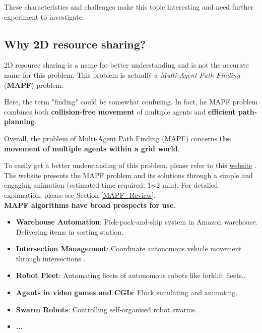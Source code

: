 \documentclass[12pt, oneside]{article}
\begin{document}
These characteristics and challenges make this topic interesting and need further experiment to investigate.

\subsection{Why 2D resource sharing?}

    2D resource sharing is a name for better understanding and is not the accurate name for this problem. This problem is actually a \textit{Multi-Agent Path Finding} (\textbf{MAPF})\cite{MAPF_Deadlock_Explain2} problem. 
    
    Here, the term "finding" could be somewhat confusing. In fact, he MAPF problem combines both \textbf{collision-free movement} of multiple agents and \textbf{efficient path-planning}.

    Overall, the problem of Multi-Agent Path Finding (MAPF) concerns \textbf{the movement of multiple agents within a grid world}.
    
    To easily get a better understanding of this problem, please refer to this \href{https://primalgrid.netlify.app/primal}{website} \footnotemark. The website presents the MAPF problem and its solutions through a simple and engaging animation (estimated time required: 1$\sim$2 min). For detailed explanation, please see Section \ref{MAPF_Review}.
    \\[8pt]
    \textbf{MAPF algorithms have broad prospects for use}.
    \begin{itemize}
        \item \textbf{Warehouse Automation}: Pick-pack-and-ship system in Amazon warehouse\cite{Amazon_Kiva}. Delivering items in sorting station\cite{Warehouse_Automation1,Warehouse_Automation2}.
        \item \textbf{Intersection Management}: Coordinate autonomous vehicle movement through intersections \cite{Intersection_Management}.
        \item \textbf{Robot Fleet}: Automating fleets of autonomous robots like forklift fleets.\cite{Fork_Fleet1,Fork_Fleet2}.  
        \item \textbf{Agents in video games and CGIs}: Flock simulating and animating\cite{Flocking_1,Flocking_2}.
        \item \textbf{Swarm Robots}: Controlling self-organised robot swarms\cite{Swarm_Robotics}.
        \item \textbf{...}
    \end{itemize}
\end{document}

